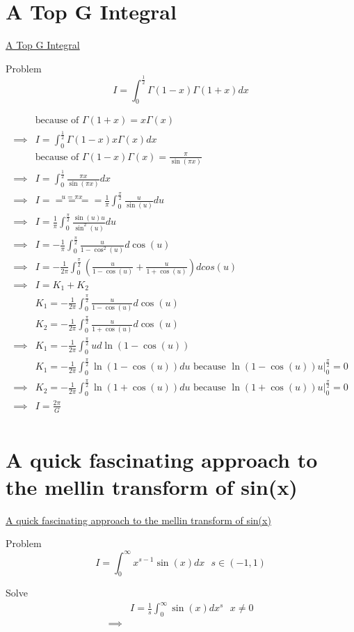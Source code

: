 \documentclass {article}
\begin{document}
\section{A Top G Integral}
\href{https://www.youtube.com/watch?v=pwJOEQPfNfQ}{A Top G Integral}


Problem  \[ I = \int_0^{\frac{1}{2}} \Gamma(1-x)\Gamma(1+x){d}x\]

\[
\begin{matrix}
          &  \text{because of } \Gamma(1+x) = x \Gamma(x)  \\
\implies  & I = \int_0^{\frac{1}{2}} \Gamma(1-x) x \Gamma(x){d}x \\
          & \text{because of  } \Gamma(1-x)\Gamma(x) = \frac{\pi}{\sin(\pi x)} \\
\implies  & I = \int_0^{\frac{1}{2}} \frac{\pi x}{\sin(\pi x)} {d}x \\
\implies  & I \stackrel{u = \pi x} {=====} \frac{1}{\pi} \int_0^{\frac{\pi}{2}} \frac{u}{\sin(u)} {d}u \\
\implies  & I = \frac{1}{\pi} \int_0^{\frac{\pi}{2}} \frac{\sin(u) u }{\sin^2(u)} {d}u \\
\implies  & I = -\frac{1}{\pi} \int_0^{\frac{\pi}{2}} \frac{u}{1 - \cos^2(u)} {d}\cos(u) \\
\implies  & I = -\frac{1}{2\pi} \int_0^{\frac{\pi}{2}} \left( \frac{u}{1-\cos(u)} + \frac{u}{1+\cos(u)} \right) {d}cos(u) \\
\implies  & I = K_1 + K_2 \\
          & K_1 = -\frac{1}{2\pi} \int_0^{\frac{\pi}{2}}  \frac{u}{1-\cos(u)} {d}\cos(u) \\
          & K_2 = -\frac{1}{2\pi} \int_0^{\frac{\pi}{2}}  \frac{u}{1+\cos(u)} {d}\cos(u) \\
\implies & K_1 = -\frac{1}{2\pi} \int_0^{\frac{\pi}{2}}  u {d}\ln(1-\cos(u)) \\
         & K_1 = -\frac{1}{2\pi} \int_0^{\frac{\pi}{2}} \ln(1-\cos(u)){d}u \text{  because  } \ln(1-\cos(u)) u \Big|_0^{\frac{\pi}{2}} = 0\\
\implies & K_2 = -\frac{1}{2\pi} \int_0^{\frac{\pi}{2}} \ln(1 + \cos(u)){d}u \text{  because } \ln(1+\cos(u)) u \Big|_0^{\frac{\pi}{2}} = 0 \\
\implies & I = \frac{2\pi}{G} \\
\end{matrix}
\]

\section{A quick fascinating approach to the mellin transform of sin(x)}
\href{https://www.youtube.com/watch?v=P5Wc6DxUciw}{A quick fascinating approach to the mellin transform of sin(x)}

Problem 
\[
  I = \int_0^{\infty} x^{s-1}\sin(x){d}x  \text{    }  s \in \left(-1,1\right)
\]

Solve
\[
\begin{matrix}
      & I = \frac{1}{s} \int_0^{\infty} \sin(x){d} x^{s}  \text{   } x \ne 0 \\  
\implies       & 
\end{matrix}
\]
\end{document}
